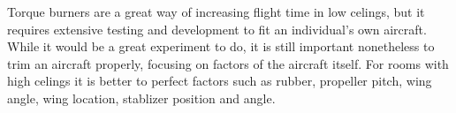 \documentclass[12pt]{article}
\begin{document}
Torque burners are a great way of increasing flight time in low celings, but it requires extensive testing and development to fit an individual's own aircraft. While it would be a great experiment to do, it is still important nonetheless to trim an aircraft properly, focusing on factors of the aircraft itself. For rooms with high celings it is better to perfect factors such as rubber, propeller pitch, wing angle, wing location, stablizer position and angle. 
\end{document}
